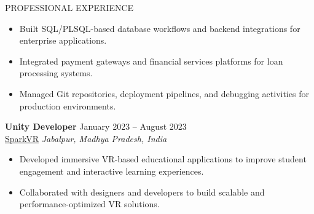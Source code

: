 \documentclass{resume}
\begin{document}
\begin{rSection}{PROFESSIONAL EXPERIENCE}
\begin{itemize}[leftmargin=*]
\item Built SQL/PLSQL-based database workflows and backend integrations for enterprise applications.

\item Integrated payment gateways and financial services platforms for loan processing systems.

\item Managed Git repositories, deployment pipelines, and debugging activities for production environments.

\end{itemize}


\textbf{Unity Developer} \hfill January 2023 -- August 2023 \\
\href{https://sparkvr.in/}{SparkVR} \hfill \textit{Jabalpur, Madhya Pradesh, India}

\begin{itemize}[leftmargin=*]

\item Developed immersive VR-based educational applications to improve student engagement and interactive learning experiences.

\item Collaborated with designers and developers to build scalable and performance-optimized VR solutions.

\end{itemize}

\end{rSection}

\end{document}
